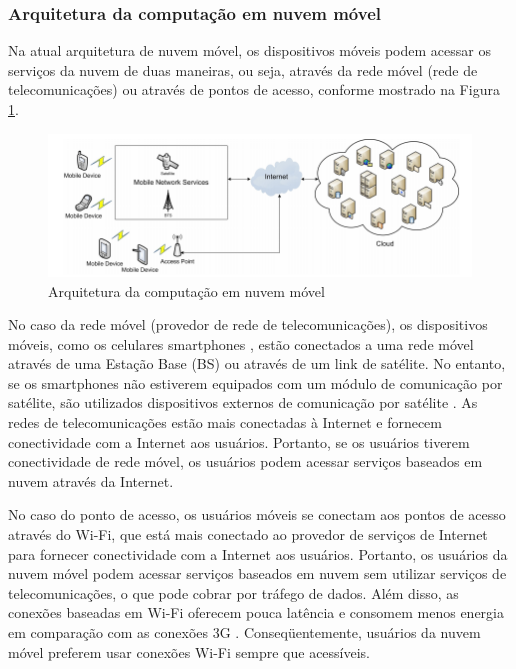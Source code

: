 \documentclass[12pt]{article}
\begin{document}
\subsubsection{Arquitetura da computação em nuvem móvel}


Na atual arquitetura de nuvem móvel, os dispositivos móveis podem acessar os serviços da nuvem de duas maneiras,
ou seja, através da rede móvel (rede de telecomunicações) ou através de pontos de acesso, conforme mostrado na Figura \ref{arquiteturaMCC}.

\begin{figure}[ht]
  \centering
  \includegraphics[scale= 0.5]{figuras/arquiteturaMCC.png}
  \caption{Arquitetura da computação em nuvem móvel}
  \label{arquiteturaMCC}
\end{figure}

No caso da rede móvel (provedor de rede de telecomunicações), os dispositivos móveis, como os celulares smartphones \cite{satelite},
estão conectados a uma rede móvel através de uma Estação Base (BS) ou através de um link de satélite. No entanto, 
se os smartphones não estiverem equipados com um módulo de comunicação por satélite, são utilizados dispositivos 
externos de comunicação por satélite \cite{spot}. As redes de telecomunicações estão mais conectadas à Internet e 
fornecem conectividade com a Internet aos usuários. Portanto, se os usuários tiverem conectividade de rede móvel, 
os usuários podem acessar serviços baseados em nuvem através da Internet.

No caso do ponto de acesso, os usuários móveis se conectam aos pontos de acesso através do Wi-Fi, que está mais conectado 
ao provedor de serviços de Internet para fornecer conectividade com a Internet aos usuários. Portanto, os usuários da nuvem móvel
podem acessar serviços baseados em nuvem sem utilizar serviços de telecomunicações, o que pode cobrar por tráfego de dados. 
Além disso, as conexões baseadas em Wi-Fi oferecem pouca latência e consomem menos energia em comparação com as conexões 3G \cite{cuervo2010}.
Conseqüentemente, usuários da nuvem móvel preferem usar conexões Wi-Fi sempre que acessíveis.
\end{document}
